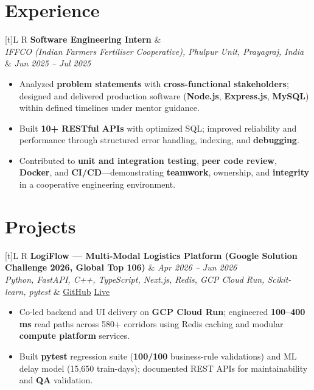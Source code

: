 \documentclass[a4paper,10pt]{article}
\newcommand{\resumeSubheading}[4]{%
  \vspace{0.5mm}
  \noindent
  \begin{tabularx}{\textwidth}[t]{L R}
    \textbf{#1} & #4 \\
    \textit{#3} & \textit{#2} \\
  \end{tabularx}
  \vspace{-0.5mm}%
}
\newcommand{\resumeProject}[4]{%
  \vspace{0.5mm}
  \noindent
  \begin{tabularx}{\textwidth}[t]{L R}
    \textbf{#1} & \textit{#3} \\
    \textit{#2} & #4 \\
  \end{tabularx}
  \vspace{-0.5mm}%
}
\begin{document}
\section{Experience}
\small
\resumeSubheading
  {Software Engineering Intern}{Jun 2025 -- Jul 2025}
  {IFFCO (Indian Farmers Fertiliser Cooperative), Phulpur Unit, Prayagraj, India}{}
\begin{itemize}
  \item Analyzed \textbf{problem statements} with \textbf{cross-functional stakeholders}; designed and delivered production software (\textbf{Node.js}, \textbf{Express.js}, \textbf{MySQL}) within defined timelines under mentor guidance.
  \item Built \textbf{10+ RESTful APIs} with optimized SQL; improved reliability and performance through structured error handling, indexing, and \textbf{debugging}.
  \item Contributed to \textbf{unit and integration testing}, \textbf{peer code review}, \textbf{Docker}, and \textbf{CI/CD}---demonstrating \textbf{teamwork}, ownership, and \textbf{integrity} in a cooperative engineering environment.
\end{itemize}

\section{Projects}
\small

\resumeProject
  {LogiFlow --- Multi-Modal Logistics Platform (Google Solution Challenge 2026, Global Top 106)}
  {Python, FastAPI, C++, TypeScript, Next.js, Redis, GCP Cloud Run, Scikit-learn, pytest}
  {Apr 2026 -- Jun 2026}
  {\href{https://github.com/Ojas-Srivastava05/LogiFlow-Solution-Challenge-2026}{GitHub} \textbar{} \href{https://logi-flow-solution-challenge-2026.vercel.app/}{Live}}
\begin{itemize}
  \item Co-led backend and UI delivery on \textbf{GCP Cloud Run}; engineered \textbf{100--400 ms} read paths across 580+ corridors using Redis caching and modular \textbf{compute platform} services.
  \item Built \textbf{pytest} regression suite (\textbf{100/100} business-rule validations) and ML delay model (15,650 train-days); documented REST APIs for maintainability and \textbf{QA} validation.
\end{itemize}
\end{document}
